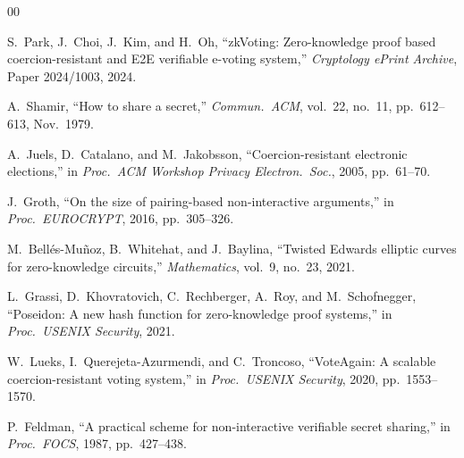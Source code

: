 \documentclass[conference]{IEEEtran}
\begin{document}
\begin{thebibliography}{00}

S.~Park, J.~Choi, J.~Kim, and H.~Oh,
``zkVoting: Zero-knowledge proof based coercion-resistant and E2E verifiable e-voting system,''
\textit{Cryptology ePrint Archive}, Paper 2024/1003, 2024.

A.~Shamir,
``How to share a secret,''
\textit{Commun.\ ACM}, vol.~22, no.~11, pp.~612--613, Nov.\ 1979.

A.~Juels, D.~Catalano, and M.~Jakobsson,
``Coercion-resistant electronic elections,''
in \textit{Proc.\ ACM Workshop Privacy Electron.\ Soc.}, 2005, pp.~61--70.

J.~Groth,
``On the size of pairing-based non-interactive arguments,''
in \textit{Proc.\ EUROCRYPT}, 2016, pp.~305--326.

M.~Bellés-Muñoz, B.~Whitehat, and J.~Baylina,
``Twisted Edwards elliptic curves for zero-knowledge circuits,''
\textit{Mathematics}, vol.~9, no.~23, 2021.

L.~Grassi, D.~Khovratovich, C.~Rechberger, A.~Roy, and M.~Schofnegger,
``Poseidon: A new hash function for zero-knowledge proof systems,''
in \textit{Proc.\ USENIX Security}, 2021.

W.~Lueks, I.~Querejeta-Azurmendi, and C.~Troncoso,
``VoteAgain: A scalable coercion-resistant voting system,''
in \textit{Proc.\ USENIX Security}, 2020, pp.~1553--1570.

P.~Feldman,
``A practical scheme for non-interactive verifiable secret sharing,''
in \textit{Proc.\ FOCS}, 1987, pp.~427--438.

\end{thebibliography}
\end{document}
